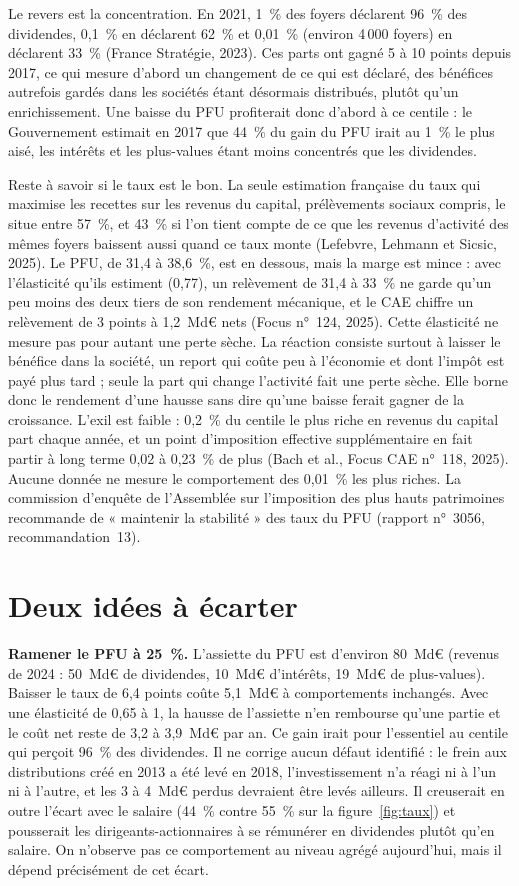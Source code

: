 \documentclass[11pt,a4paper]{article}
\begin{document}
Le revers est la concentration. En 2021, 1~\% des foyers déclarent 96~\% des dividendes, 0,1~\% en déclarent
62~\% et 0,01~\% (environ 4\,000 foyers) en déclarent 33~\% (France Stratégie, 2023). Ces parts ont gagné 5 à
10 points depuis 2017, ce qui mesure d'abord un changement de ce qui est déclaré, des bénéfices autrefois
gardés dans les sociétés étant désormais distribués, plutôt qu'un enrichissement. Une baisse du PFU profiterait
donc d'abord à ce centile : le Gouvernement estimait en 2017 que 44~\% du gain du PFU irait au 1~\% le plus
aisé, les intérêts et les plus-values étant moins concentrés que les dividendes.

Reste à savoir si le taux est le bon. La seule estimation française du taux qui maximise les recettes sur les
revenus du capital, prélèvements sociaux compris, le situe entre 57~\%, et 43~\% si l'on tient compte de ce
que les revenus d'activité des mêmes foyers baissent aussi quand ce taux monte (Lefebvre, Lehmann et Sicsic,
2025). Le PFU, de 31,4 à 38,6~\%, est en dessous, mais la marge est mince : avec l'élasticité qu'ils estiment
(0,77), un relèvement de 31,4 à 33~\% ne garde qu'un peu moins des deux tiers de son rendement mécanique, et
le CAE chiffre un relèvement de 3 points à 1,2~Md€ nets (Focus n°~124, 2025). Cette élasticité ne mesure pas
pour autant une perte sèche. La réaction consiste surtout à laisser le bénéfice dans la société, un report qui
coûte peu à l'économie et dont l'impôt est payé plus tard ; seule la part qui change l'activité fait une perte
sèche. Elle borne donc le rendement d'une hausse sans dire qu'une baisse ferait gagner de la croissance.
L'exil est faible : 0,2~\% du centile le plus riche en revenus du capital part chaque année, et un point
d'imposition effective supplémentaire en fait partir à long terme 0,02 à 0,23~\% de plus (Bach et al., Focus
CAE n°~118, 2025). Aucune donnée ne mesure le comportement des 0,01~\% les plus riches. La commission d'enquête
de l'Assemblée sur l'imposition des plus hauts patrimoines recommande de « maintenir la stabilité » des taux du
PFU (rapport n°~3056, recommandation~13).

\section{Deux idées à écarter}

\textbf{Ramener le PFU à 25~\%.} L'assiette du PFU est d'environ 80~Md€ (revenus de 2024 : 50~Md€ de
dividendes, 10~Md€ d'intérêts, 19~Md€ de plus-values). Baisser le taux de 6,4 points coûte 5,1~Md€ à
comportements inchangés. Avec une élasticité de 0,65 à 1, la hausse de l'assiette n'en rembourse qu'une
partie et le coût net reste de 3,2 à 3,9~Md€ par an. Ce gain irait pour l'essentiel au centile qui perçoit
96~\% des dividendes. Il ne corrige aucun défaut identifié : le frein aux distributions créé en 2013 a été levé
en 2018, l'investissement n'a réagi ni à l'un ni à l'autre, et les 3 à 4~Md€ perdus devraient être levés
ailleurs. Il creuserait en outre l'écart avec le
salaire (44~\% contre 55~\% sur la figure~\ref{fig:taux}) et pousserait les dirigeants-actionnaires à se
rémunérer en dividendes plutôt qu'en salaire. On n'observe pas ce comportement au niveau agrégé aujourd'hui,
mais il dépend précisément de cet écart.
\end{document}
